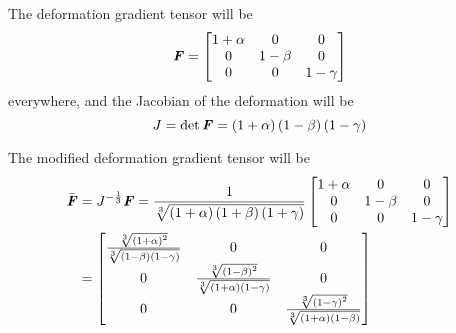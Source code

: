 The deformation gradient tensor will be
\begin{equation}
  \tensor{F}= \begin{bmatrix}
    1+\alpha & 0 & 0 \\
    0 & 1-\beta & 0 \\
    0 & 0 & 1-\gamma
  \end{bmatrix}
  \label{eqn:FiniteElasticityUniaxialCubeDeformationGradient}
\end{equation}
everywhere, and the Jacobian of the deformation will be 
\begin{equation}
  J = \determinant{\tensor{F}}=\pbrac{1+\alpha}\pbrac{1-\beta}\pbrac{1-\gamma}
  \label{eqn:FiniteElasticityUniaxialCubeJacobian}
\end{equation}

The modified deformation gradient tensor will be
\begin{equation}
  \begin{split}
    \bar{\tensor{F}}&=J^{-\frac{1}{3}}\tensor{F}=\frac{1}{\cuberoot{\pbrac{1+\alpha}\pbrac{1+\beta}\pbrac{1+\gamma}}}\begin{bmatrix}
      1+\alpha & 0 & 0 \\
      0 & 1-\beta & 0 \\
      0 & 0 & 1-\gamma
    \end{bmatrix}\\
    &=\begin{bmatrix}
    \frac{\cuberoot{\pbrac{1+\alpha}^{2}}}{\cuberoot{\pbrac{1-\beta}\pbrac{1-\gamma}}}
    & 0 & 0 \\
    0 &
    \frac{\cuberoot{\pbrac{1-\beta}^{2}}}{\cuberoot{\pbrac{1+\alpha}\pbrac{1-\gamma}}}
    & 0 \\
    0 & 0 & \frac{\cuberoot{\pbrac{1-\gamma}^{2}}}{\cuberoot{\pbrac{1+\alpha}\pbrac{1-\beta}}}
    \end{bmatrix}
  \end{split}
  \label{eqn:FiniteElasticityUniaxialCubeModDeformationGradient}
\end{equation}

